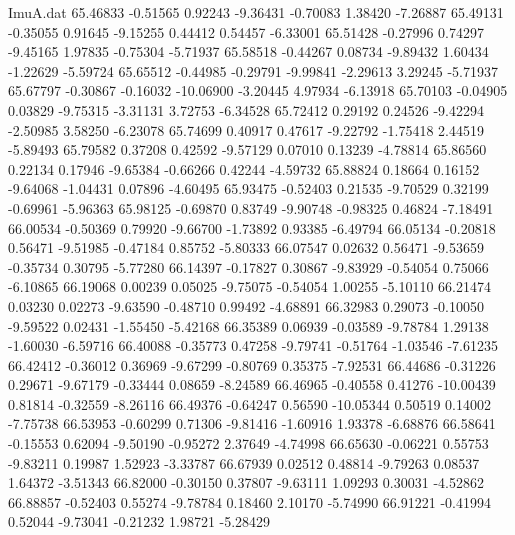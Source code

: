 \begin{filecontents}{ImuA.dat}
  65.46833   -0.51565    0.92243   -9.36431   -0.70083    1.38420   -7.26887
  65.49131   -0.35055    0.91645   -9.15255    0.44412    0.54457   -6.33001
  65.51428   -0.27996    0.74297   -9.45165    1.97835   -0.75304   -5.71937
  65.58518   -0.44267    0.08734   -9.89432    1.60434   -1.22629   -5.59724
  65.65512   -0.44985   -0.29791   -9.99841   -2.29613    3.29245   -5.71937
  65.67797   -0.30867   -0.16032  -10.06900   -3.20445    4.97934   -6.13918
  65.70103   -0.04905    0.03829   -9.75315   -3.31131    3.72753   -6.34528
  65.72412    0.29192    0.24526   -9.42294   -2.50985    3.58250   -6.23078
  65.74699    0.40917    0.47617   -9.22792   -1.75418    2.44519   -5.89493
  65.79582    0.37208    0.42592   -9.57129    0.07010    0.13239   -4.78814
  65.86560    0.22134    0.17946   -9.65384   -0.66266    0.42244   -4.59732
  65.88824    0.18664    0.16152   -9.64068   -1.04431    0.07896   -4.60495
  65.93475   -0.52403    0.21535   -9.70529    0.32199   -0.69961   -5.96363
  65.98125   -0.69870    0.83749   -9.90748   -0.98325    0.46824   -7.18491
  66.00534   -0.50369    0.79920   -9.66700   -1.73892    0.93385   -6.49794
  66.05134   -0.20818    0.56471   -9.51985   -0.47184    0.85752   -5.80333
  66.07547    0.02632    0.56471   -9.53659   -0.35734    0.30795   -5.77280
  66.14397   -0.17827    0.30867   -9.83929   -0.54054    0.75066   -6.10865
  66.19068    0.00239    0.05025   -9.75075   -0.54054    1.00255   -5.10110
  66.21474    0.03230    0.02273   -9.63590   -0.48710    0.99492   -4.68891
  66.32983    0.29073   -0.10050   -9.59522    0.02431   -1.55450   -5.42168
  66.35389    0.06939   -0.03589   -9.78784    1.29138   -1.60030   -6.59716
  66.40088   -0.35773    0.47258   -9.79741   -0.51764   -1.03546   -7.61235
  66.42412   -0.36012    0.36969   -9.67299   -0.80769    0.35375   -7.92531
  66.44686   -0.31226    0.29671   -9.67179   -0.33444    0.08659   -8.24589
  66.46965   -0.40558    0.41276  -10.00439    0.81814   -0.32559   -8.26116
  66.49376   -0.64247    0.56590  -10.05344    0.50519    0.14002   -7.75738
  66.53953   -0.60299    0.71306   -9.81416   -1.60916    1.93378   -6.68876
  66.58641   -0.15553    0.62094   -9.50190   -0.95272    2.37649   -4.74998
  66.65630   -0.06221    0.55753   -9.83211    0.19987    1.52923   -3.33787
  66.67939    0.02512    0.48814   -9.79263    0.08537    1.64372   -3.51343
  66.82000   -0.30150    0.37807   -9.63111    1.09293    0.30031   -4.52862
  66.88857   -0.52403    0.55274   -9.78784    0.18460    2.10170   -5.74990
  66.91221   -0.41994    0.52044   -9.73041   -0.21232    1.98721   -5.28429

\end{filecontents}
